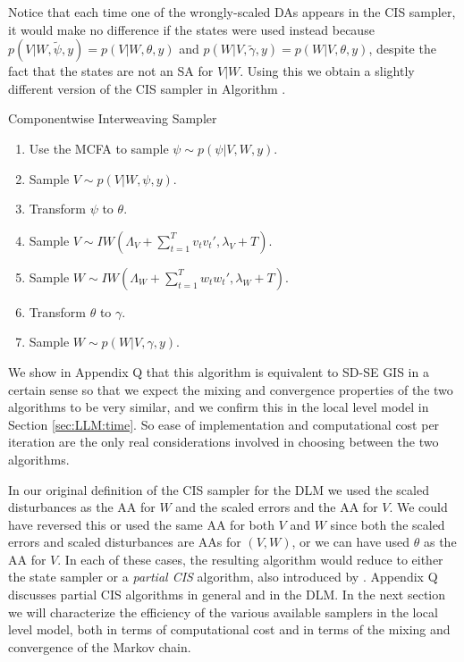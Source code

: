 \documentclass[12pt]{article}
\begin{document}
Notice that each time one of the wrongly-scaled DAs appears in the CIS sampler, it would make no difference if the states were used instead because $p(V|W,\tilde{\psi},y)=p(V|W,\theta,y)$ and $p(W|V,\tilde{\gamma},y)=p(W|V,\theta,y)$, despite the fact that the states are not an SA for $V|W$. Using this we obtain a slightly different version of the CIS sampler in Algorithm .
\begin{alg*}[CIS]Componentwise Interweaving Sampler\label{alg:DLMcis}
\begin{enumerate}
\item Use the MCFA to sample $\psi \sim p(\psi|V,W,y)$.
\item Sample $V \sim p(V|W,\psi,y)$.
\item Transform $\psi$ to $\theta$.
\item Sample $V \sim IW\left(\Lambda_V + \sum_{t=1}^Tv_tv_t',\lambda_V + T\right)$.
\item Sample $W \sim IW\left(\Lambda_W + \sum_{t=1}^Tw_tw_t',\lambda_{W} + T\right)$.
\item Transform $\theta$ to $\gamma$.
\item Sample $W \sim p(W|V,\gamma,y)$.
\end{enumerate}
\end{alg*}
We show in Appendix Q that this algorithm is equivalent to SD-SE GIS in a certain sense so that we expect the mixing and convergence properties of the two algorithms to be very similar, and we confirm this in the local level model in Section \ref{sec:LLM:time}. So ease of implementation and computational cost per iteration are the only real considerations involved in choosing between the two algorithms.

In our original definition of the CIS sampler for the DLM we used the scaled disturbances as the AA for $W$ and the scaled errors and the AA for $V$. We could have reversed this or used the same AA for both $V$ and $W$ since both the scaled errors and scaled disturbances are AAs for $(V,W)$, or we can have used $\theta$ as the AA for $V$. In each of these cases, the resulting algorithm would reduce to either the state sampler or a {\it partial CIS} algorithm, also introduced by \citet{yu2011center}. Appendix Q discusses partial CIS algorithms in general and in the DLM. In the next section we will characterize the efficiency of the various available samplers in the local level model, both in terms of computational cost and in terms of the mixing and convergence of the Markov chain.
\end{document}
